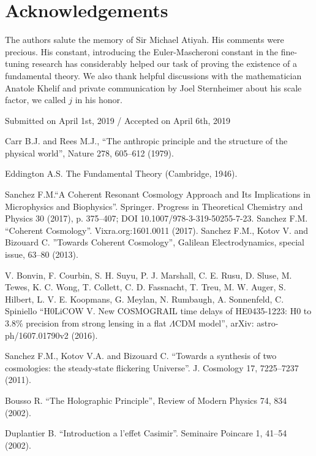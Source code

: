 \documentclass[twoside,draft]{article}
\begin{document}
\begin{sloppypar}
\section*{Acknowledgements}
The authors salute the memory of Sir Michael Atiyah. His comments were precious. His constant, introducing the Euler-Mascheroni constant in the fine-tuning research has considerably helped our task
of proving the existence of a fundamental theory. We also thank helpful discussions with the 
mathematician Anatole Khelif and private communication by Joel Sternheimer about his scale factor, 
we called $j$ in his honor.
%
\begin{flushright}\footnotesize
Submitted on April 1st, 2019 / Accepted on April 6th, 2019
\end{flushright}


\begin{thebibliography}{99}\footnotesize

 Carr B.J. and Rees M.J., ``The anthropic principle and the
structure of the physical world'', Nature 278, 605--612 (1979).

 Eddington A.S. The Fundamental Theory (Cambridge, 1946).

 Sanchez F.M.``A Coherent Resonant Cosmology Approach and Its Implications in Microphysics and Biophysics''. Springer. Progress in Theoretical Chemistry and Physics 30 (2017), p. 375--407; DOI 10.1007/978-3-319-50255-7-23.  Sanchez F.M. ``Coherent Cosmology''. Vixra.org:1601.0011 (2017). Sanchez F.M., Kotov V. and Bizouard C. ''Towards Coherent Cosmology'', Galilean Electrodynamics, special issue, 63--80 (2013).

 V. Bonvin, F. Courbin, S. H. Suyu, P. J. Marshall, C. E. Rusu, D. Sluse, M. Tewes, K. C. Wong, T. Collett, C. D. Fassnacht, T. Treu, M. W. Auger, S. Hilbert, L. V. E. Koopmans, G. Meylan, N. Rumbaugh, A. Sonnenfeld, C. Spiniello ``H0LiCOW V. New COSMOGRAIL time delays of HE0435-1223: H0 to 3.8\% precision from strong lensing in a flat $\Lambda$CDM model'', arXiv: astro-ph/1607.01790v2 (2016).

 Sanchez F.M., Kotov V.A. and Bizouard C. ``Towards a synthesis of
two cosmologies: the steady-state flickering Universe''. J. Cosmology 17,
7225--7237 (2011).

 Bousso R. ``The Holographic Principle'', Review of Modern Physics
74, 834 (2002).

 Duplantier B. ``Introduction a l'effet Casimir''. Seminaire
Poincare 1, 41--54 (2002).


\end{thebibliography}
\end{sloppypar}
\end{document}
